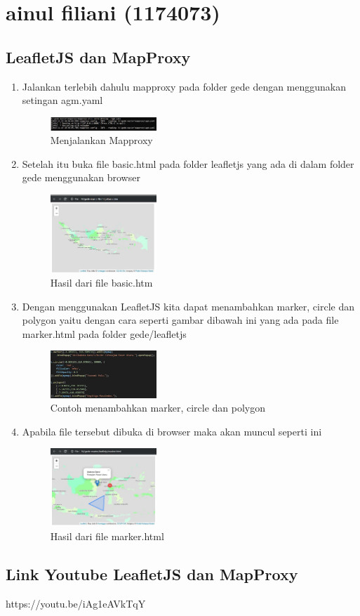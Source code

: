 \section{ainul filiani (1174073)}
\subsection{LeafletJS dan MapProxy}
\begin{enumerate}
    \item Jalankan terlebih dahulu mapproxy pada folder gede dengan menggunakan setingan agm.yaml
        \hfill\break
        \begin{figure}[H]
        \includegraphics[width=4cm]{figures/tugas5/1174073/1.jpg}
        \centering
        \caption{Menjalankan Mapproxy}
        \end{figure}
    \item Setelah itu buka file basic.html pada folder leafletjs yang ada di dalam folder gede menggunakan browser
        \hfill\break
        \begin{figure}[H]
        \includegraphics[width=4cm]{figures/tugas5/1174073/3.jpg}
        \centering
        \caption{Hasil dari file basic.htm}
        \end{figure}
   \item Dengan menggunakan LeafletJS kita dapat menambahkan marker, circle dan polygon yaitu dengan cara seperti gambar dibawah ini yang ada pada file marker.html pada folder gede/leafletjs
        \hfill\break
        \begin{figure}[H]
        \includegraphics[width=4cm]{figures/tugas5/1174073/4.jpg}
        \centering
        \caption{Contoh menambahkan marker, circle dan polygon}
        \end{figure}
   \item Apabila file tersebut dibuka di browser maka akan muncul seperti ini
        \hfill\break
        \begin{figure}[H]
        \includegraphics[width=4cm]{figures/tugas5/1174073/5.jpg}
        \centering
        \caption{Hasil dari file marker.html}
        \end{figure}
\end{enumerate}
\subsection{Link Youtube LeafletJS dan MapProxy}
https://youtu.be/iAg1eAVkTqY

